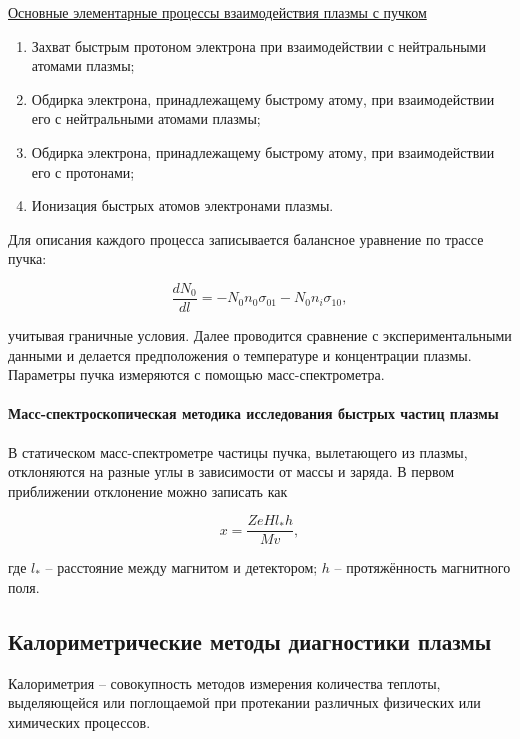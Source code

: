 \documentclass[10pt, a4paper]{article}
\begin{document}
\uline{Основные элементарные процессы взаимодействия плазмы с пучком}

\begin{enumerate}
	\item Захват быстрым протоном электрона при взаимодействии с нейтральными атомами плазмы;
	\item Обдирка электрона, принадлежащему быстрому атому, при взаимодействии его с нейтральными атомами плазмы;
	\item Обдирка электрона, принадлежащему быстрому атому, при взаимодействии его с протонами;
	\item Ионизация быстрых атомов электронами плазмы.
\end{enumerate}

Для описания каждого процесса записывается балансное уравнение по трассе пучка:

\begin{equation}
	\frac{dN_0}{dl} = -N_0 n_0 \sigma_{01}-N_0 n_i \sigma_{10},
\end{equation}

учитывая граничные условия. Далее проводится сравнение с экспериментальными данными и делается предположения о температуре  и концентрации плазмы. Параметры пучка измеряются с помощью масс-спектрометра.

\paragraph{Масс-спектроскопическая методика исследования быстрых частиц плазмы}

В статическом масс-спектрометре частицы пучка, вылетающего из плазмы, отклоняются на разные углы в зависимости от массы и заряда. В первом приближении отклонение можно записать как
 
\begin{equation}
	x = \frac{ZeHl_{*}h}{Mv},
\end{equation}

где $l_{*}$ -- расстояние между магнитом и детектором; $h$ -- протяжённость магнитного поля.

\subsection{Калориметрические методы диагностики плазмы}

Калориметрия -- совокупность методов измерения количества теплоты, выделяющейся или поглощаемой при протекании различных физических или химических процессов.
\end{document}
